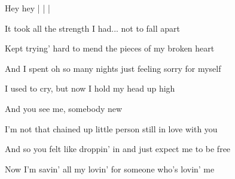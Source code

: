 \begin{song}
\begin{chorusbox}{\PrechorusAndChorus}
\bigskip

Hey hey  |   |   |   \par
\end{chorusbox}

\bigskip

It took all the strength I had... not to fall apart \par
Kept trying' hard to mend the pieces of my broken heart \par
And I spent oh so many nights just feeling sorry for myself \par
I used to cry, but now I hold my head up high \par

\bigskip

And you see me, somebody new \par
I'm not that chained up little person still in love with you \par
And so you felt like droppin' in and just expect me to be free \par
Now I'm savin' all my lovin' for someone who's lovin' me \par

\bigskip

\PrechorusAndChorus

\bigskip

 \par

\end{song}